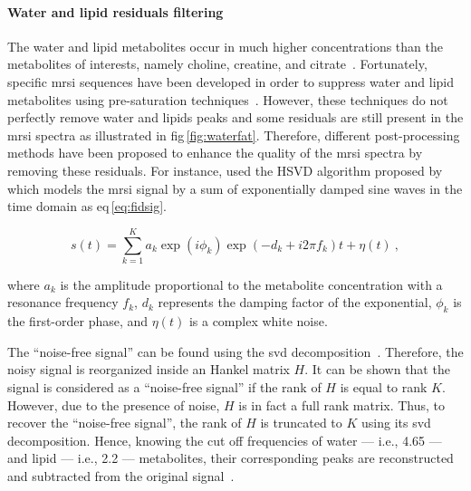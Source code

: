 \paragraph{Water and lipid residuals filtering} The water and lipid metabolites occur in much higher concentrations than the metabolites of interests, namely choline, creatine, and citrate~\cite{Zhu2010,Osorio-Garcia2012}.
Fortunately, specific \ac{mrsi} sequences have been developed in order to suppress water and lipid metabolites using pre-saturation techniques~\cite{Zhu2010}.
However, these techniques do not perfectly remove water and lipids peaks and some residuals are still present in the \ac{mrsi} spectra as illustrated in \ac{fig}\,\ref{fig:waterfat}.
Therefore, different post-processing methods have been proposed to enhance the quality of the \ac{mrsi} spectra by removing these residuals.
For instance, \citeauthor{Kelm2007} used the HSVD algorithm proposed by \citeauthor{Pijnappel1992} which models the \ac{mrsi} signal by a sum of exponentially damped sine waves in the time domain as \acs{eq}\,\eqref{eq:fidsig}.

\begin{equation}
	s(t) = \sum_{k=1}^{K} a_{k}\exp(i \phi_k) \exp( -d_{k} + i 2 \pi f_{k} ) t + \eta(t) \ ,
	\label{eq:fidsig}
\end{equation}

\noindent where $a_k$ is the amplitude proportional to the metabolite concentration with a resonance frequency $f_{k}$, $d_k$ represents the damping factor of the exponential, $\phi_k$ is the first-order phase, and $\eta(t)$ is a complex white noise.

The ``noise-free signal'' can be found using the \ac{svd} decomposition~\cite{Pijnappel1992}.
Therefore, the noisy signal is reorganized inside an Hankel matrix $H$.
It can be shown that the signal is considered as a ``noise-free signal'' if the rank of $H$ is equal to rank $K$.
However, due to the presence of noise, $H$ is in fact a full rank matrix.
Thus, to recover the ``noise-free signal'', the rank of $H$ is truncated to $K$ using its \ac{svd} decomposition.
Hence, knowing the cut off frequencies of water --- i.e., \SI{4.65}{\ppm} --- and lipid --- i.e., \SI{2.2}{\ppm} --- metabolites, their corresponding peaks are reconstructed and subtracted from the original signal~\cite{Laudadio2002}.
	
